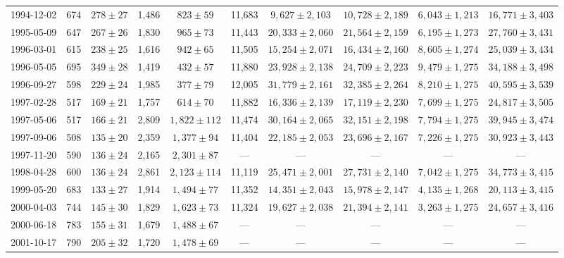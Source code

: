 \begin{landscape}
\begin{longtable}{cccccccccc}
{1994-12-02} & 674 & {$278  \pm  27$} & 1,486 & {$823 \pm 59$} & 11,683 & {$9,627 \pm 2,103$} & {$10,728 \pm 2,189$} & {$6,043 \pm 1,213$} & {$16,771 \pm 3,403$} \\
{1995-05-09} & 647 & {$267  \pm  26$} & 1,830 & {$965 \pm 73$} & 11,443 & {$20,333 \pm 2,060$} & {$21,564 \pm 2,159$} & {$6,195 \pm 1,273$} & {$27,760 \pm 3,431$} \\
{1996-03-01} & 615 & {$238  \pm  25$} & 1,616 & {$942 \pm 65$} & 11,505 & {$15,254 \pm 2,071$} & {$16,434 \pm 2,160$} & {$8,605 \pm 1,274$} & {$25,039 \pm 3,434$} \\
{1996-05-05} & 695 & {$349  \pm  28$} & 1,419 & {$432 \pm 57$} & 11,880 & {$23,928 \pm 2,138$} & {$24,709 \pm 2,223$} & {$9,479 \pm 1,275$} & {$34,188 \pm 3,498$} \\
{1996-09-27} & 598 & {$229  \pm  24$} & 1,985 & {$377 \pm 79$} & 12,005 & {$31,779 \pm 2,161$} & {$32,385 \pm 2,264$} & {$8,210 \pm 1,275$} & {$40,595 \pm 3,539$} \\
{1997-02-28} & 517 & {$169  \pm  21$} & 1,757 & {$614 \pm 70$} & 11,882 & {$16,336 \pm 2,139$} & {$17,119 \pm 2,230$} & {$7,699 \pm 1,275$} & {$24,817 \pm 3,505$} \\
{1997-05-06} & 517 & {$166  \pm  21$} & 2,809 & {$1,822 \pm 112$} & 11,474 & {$30,164 \pm 2,065$} & {$32,151 \pm 2,198$} & {$7,794 \pm 1,275$} & {$39,945 \pm 3,474$} \\
{1997-09-06} & 508 & {$135  \pm  20$} & 2,359 & {$1,377 \pm 94$} & 11,404 & {$22,185 \pm 2,053$} & {$23,696 \pm 2,167$} & {$7,226 \pm 1,275$} & {$30,923 \pm 3,443$} \\
{1997-11-20} & 590 & {$136  \pm  24$} & 2,165 & {$2,301 \pm 87$} & --- & --- & --- & --- & --- \\
{1998-04-28} & 600 & {$136  \pm  24$} & 2,861 & {$2,123 \pm 114$} & 11,119 & {$25,471 \pm 2,001$} & {$27,731 \pm 2,140$} & {$7,042 \pm 1,275$} & {$34,773 \pm 3,415$} \\
{1999-05-20} & 683 & {$133  \pm  27$} & 1,914 & {$1,494 \pm 77$} & 11,352 & {$14,351 \pm 2,043$} & {$15,978 \pm 2,147$} & {$4,135 \pm 1,268$} & {$20,113 \pm 3,415$} \\
{2000-04-03} & 744 & {$145  \pm  30$} & 1,829 & {$1,623 \pm 73$} & 11,324 & {$19,627 \pm 2,038$} & {$21,394 \pm 2,141$} & {$3,263 \pm 1,275$} & {$24,657 \pm 3,416$} \\
{2000-06-18} & 783 & {$155  \pm  31$} & 1,679 & {$1,488 \pm 67$} & --- & --- & --- & --- & --- \\
{2001-10-17} & 790 & {$205  \pm  32$} & 1,720 & {$1,478 \pm 69$} & --- & --- & --- & --- & --- \\

\end{longtable}
\end{landscape}
